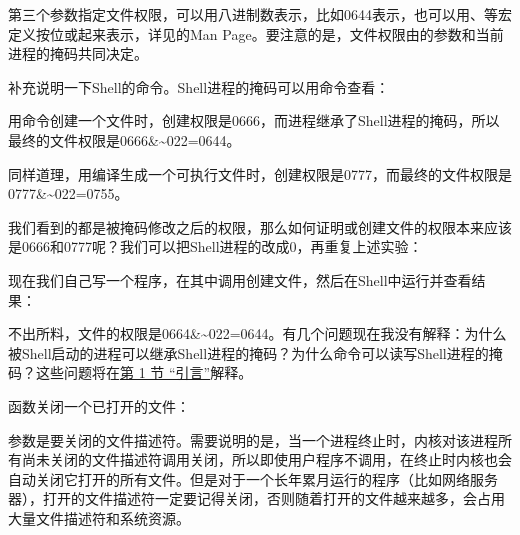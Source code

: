 第三个参数指定文件权限，可以用八进制数表示，比如0644表示，也可以用、等宏定义按位或起来表示，详见的Man Page。要注意的是，文件权限由的参数和当前进程的掩码共同决定。



补充说明一下Shell的命令。Shell进程的掩码可以用命令查看：




用命令创建一个文件时，创建权限是0666，而进程继承了Shell进程的掩码，所以最终的文件权限是0666\&\textasciitilde{}022=\BookSplit{}0644。




同样道理，用编译生成一个可执行文件时，创建权限是0777，而最终的文件权限是0777\&\textasciitilde{}022=\BookSplit{}0755。




我们看到的都是被掩码修改之后的权限，那么如何证明或创建文件的权限本来应该是0666和0777呢？我们可以把Shell进程的改成0，再重复上述实验：




现在我们自己写一个程序，在其中调用创建文件，然后在Shell中运行并查看结果：




不出所料，文件的权限是0664\&\textasciitilde{}022=\BookSplit{}0644。有几个问题现在我没有解释：为什么被Shell启动的进程可以继承Shell进程的掩码？为什么命令可以读写Shell进程的掩码？这些问题将在\hyperlink{db.ch30s01.id2865382}{第 1 节 “引言”}解释。



函数关闭一个已打开的文件：




参数是要关闭的文件描述符。需要说明的是，当一个进程终止时，内核对该进程所有尚未关闭的文件描述符调用关闭，所以即使用户程序不调用，在终止时内核也会自动关闭它打开的所有文件。但是对于一个长年累月运行的程序（比如网络服务器），打开的文件描述符一定要记得关闭，否则随着打开的文件越来越多，会占用大量文件描述符和系统资源。



